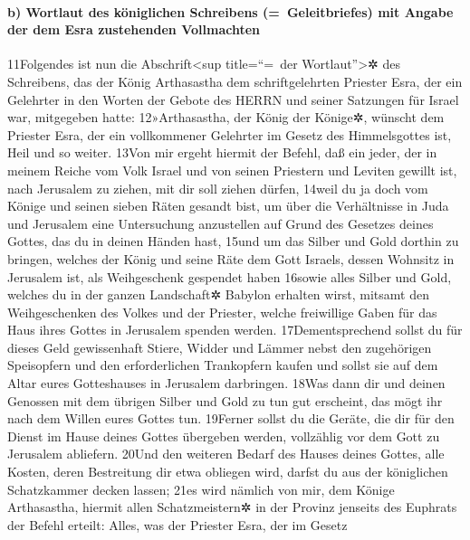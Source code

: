 \hypertarget{b-wortlaut-des-kuxf6niglichen-schreibens-geleitbriefes-mit-angabe-der-dem-esra-zustehenden-vollmachten}{%
\paragraph{b) Wortlaut des königlichen Schreibens (=~Geleitbriefes) mit
Angabe der dem Esra zustehenden
Vollmachten}\label{b-wortlaut-des-kuxf6niglichen-schreibens-geleitbriefes-mit-angabe-der-dem-esra-zustehenden-vollmachten}}

11Folgendes ist nun die Abschrift\textless sup title=``=~der
Wortlaut''\textgreater✲ des Schreibens, das der König Arthasastha dem
schriftgelehrten Priester Esra, der ein Gelehrter in den Worten der
Gebote des HERRN und seiner Satzungen für Israel war, mitgegeben hatte:
12»Arthasastha, der König der Könige✲, wünscht dem Priester Esra, der
ein vollkommener Gelehrter im Gesetz des Himmelsgottes ist, Heil und so
weiter. 13Von mir ergeht hiermit der Befehl, daß ein jeder, der in
meinem Reiche vom Volk Israel und von seinen Priestern und Leviten
gewillt ist, nach Jerusalem zu ziehen, mit dir soll ziehen dürfen,
14weil du ja doch vom Könige und seinen sieben Räten gesandt bist, um
über die Verhältnisse in Juda und Jerusalem eine Untersuchung
anzustellen auf Grund des Gesetzes deines Gottes, das du in deinen
Händen hast, 15und um das Silber und Gold dorthin zu bringen, welches
der König und seine Räte dem Gott Israels, dessen Wohnsitz in Jerusalem
ist, als Weihgeschenk gespendet haben 16sowie alles Silber und Gold,
welches du in der ganzen Landschaft✲ Babylon erhalten wirst, mitsamt den
Weihgeschenken des Volkes und der Priester, welche freiwillige Gaben für
das Haus ihres Gottes in Jerusalem spenden werden. 17Dementsprechend
sollst du für dieses Geld gewissenhaft Stiere, Widder und Lämmer nebst
den zugehörigen Speisopfern und den erforderlichen Trankopfern kaufen
und sollst sie auf dem Altar eures Gotteshauses in Jerusalem darbringen.
18Was dann dir und deinen Genossen mit dem übrigen Silber und Gold zu
tun gut erscheint, das mögt ihr nach dem Willen eures Gottes tun.
19Ferner sollst du die Geräte, die dir für den Dienst im Hause deines
Gottes übergeben werden, vollzählig vor dem Gott zu Jerusalem abliefern.
20Und den weiteren Bedarf des Hauses deines Gottes, alle Kosten, deren
Bestreitung dir etwa obliegen wird, darfst du aus der königlichen
Schatzkammer decken lassen; 21es wird nämlich von mir, dem Könige
Arthasastha, hiermit allen Schatzmeistern✲ in der Provinz jenseits des
Euphrats der Befehl erteilt: Alles, was der Priester Esra, der im Gesetz
